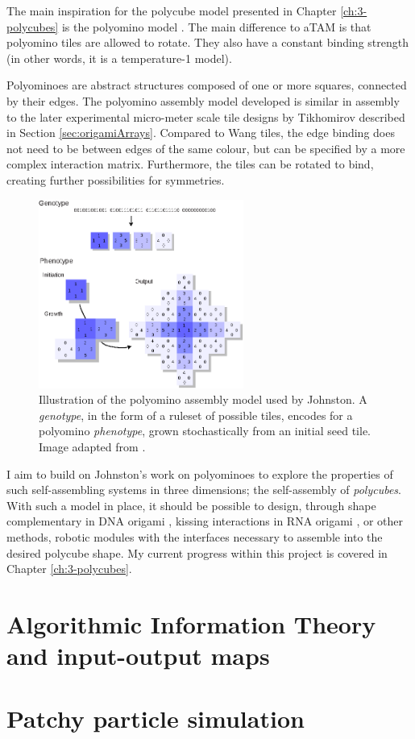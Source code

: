 The main inspiration for the polycube model presented in Chapter \ref{ch:3-polycubes} is the polyomino model \cite{ahnert2010self}\cite{johnston2011evolutionary}. The main difference to aTAM is that polyomino tiles are allowed to rotate. They also have a constant binding strength (in other words, it is a temperature-1 model).


Polyominoes are abstract structures composed of one or more squares, connected by their edges. The polyomino assembly model developed is similar in assembly to the later experimental micro-meter scale tile designs by Tikhomirov \cite{tikhomirov2017fractal} described in Section \ref{sec:origamiArrays}. Compared to Wang tiles\cite{wang1961proving}, the edge binding does not need to be between edges of the same colour, but can be specified by a more complex interaction matrix. Furthermore, the tiles can be rotated to bind, creating further possibilities for symmetries.

\begin{figure}[h]
    \centering\includegraphics[width=0.6\textwidth]{figures/polyominoes.eps}
    \caption{Illustration of the polyomino assembly model used by Johnston. A \emph{genotype}, in the form of a ruleset of possible tiles, encodes for a polyomino \emph{phenotype}, grown stochastically from an initial seed tile. Image adapted from \cite{johnston2011evolutionary}.}
    \label{fig:polyominoes}
\end{figure}

I aim to build on Johnston's work on polyominoes to explore the properties of such self-assembling systems in three dimensions; the self-assembly of \emph{polycubes}. With such a model in place, it should be possible to design, through shape complementary in DNA origami \cite{wagenbauer2017gigadalton}, kissing interactions in RNA origami \cite{geary2014single}, or other methods, robotic modules with the interfaces necessary to assemble into the desired polycube shape. My current progress within this project is covered in Chapter \ref{ch:3-polycubes}.

\section{Algorithmic Information Theory and input-output maps}

\section{Patchy particle simulation}
